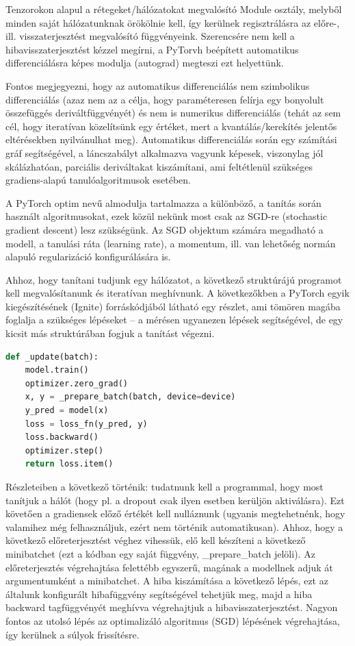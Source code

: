 \documentclass[12pt,a4paper,oneside]{report}             %
\begin{document}
Tenzorokon alapul a rétegeket/hálózatokat megvalósító Module osztály, melyből minden saját hálózatunknak örökölnie kell, így kerülnek regisztrálásra az előre-, ill. visszaterjesztést megvalósító függvényeink. Szerencsére nem kell a hibavisszaterjesztést kézzel megírni, a PyTorvh beépített automatikus differenciálásra képes modulja (autograd) megteszi ezt helyettünk.

Fontos megjegyezni, hogy az automatikus differenciálás nem szimbolikus differenciálás (azaz nem az a célja, hogy paraméteresen felírja egy bonyolult összefüggés deriváltfüggvényét) és nem is numerikus differenciálás (tehát az sem cél, hogy iteratívan közelítsünk egy értéket, mert a kvantálás/kerekítés jelentős eltérésekben nyilvánulhat meg). Automatikus differenciálás során egy számítási gráf segítségével, a láncszabályt alkalmazva vagyunk képesek, viszonylag jól skálázhatóan, parciális deriváltakat kiszámítani, ami feltétlenül szükséges gradiens-alapú tanulóalgoritmusok esetében.

A PyTorch optim nevű almodulja tartalmazza a különböző, a tanítás során használt algoritmusokat, ezek közül nekünk most csak az SGD-re (stochastic gradient descent) lesz szükségünk. Az SGD objektum számára megadható a modell, a tanulási ráta (learning rate), a momentum, ill. van lehetőség normán alapuló regularizáció konfigurálására is.

Ahhoz, hogy tanítani tudjunk egy hálózatot, a következő struktúrájú programot kell megvalósítanunk és iteratívan meghívnunk. A következőkben a PyTorch egyik kiegészítésének (Ignite) forráskódjából látható egy részlet, ami tömören magába foglalja a szükséges lépéseket – a mérésen ugyanezen lépések segítségével, de egy kicsit más struktúrában fogjuk a tanítást végezni.

\begin{lstlisting}[language=Python]
def _update(batch):
	model.train()
	optimizer.zero_grad()
	x, y = _prepare_batch(batch, device=device)
	y_pred = model(x)
	loss = loss_fn(y_pred, y)
	loss.backward()
	optimizer.step()
	return loss.item()
\end{lstlisting}

Részleteiben a következő történik: tudatnunk kell a programmal, hogy most tanítjuk a hálót (hogy pl. a dropout csak ilyen esetben kerüljön aktiválásra). Ezt követően a gradiensek előző értékét kell nulláznunk (ugyanis megtehetnénk, hogy valamihez még felhasználjuk, ezért nem történik automatikusan). Ahhoz, hogy a következő előreterjesztést véghez vihessük, elő kell készíteni a következő minibatchet (ezt a kódban egy saját függvény, \_prepare\_batch jelöli). Az előreterjesztés végrehajtása felettébb egyszerű, magának a modellnek adjuk át argumentumként a minibatchet. A hiba kiszámítása a következő lépés, ezt az általunk konfigurált hibafüggvény segítségével tehetjük meg, majd a hiba backward tagfüggvényét meghívva végrehajtjuk a hibavisszaterjesztést. Nagyon fontos az utolsó lépés az optimalizáló algoritmus (SGD) lépésének végrehajtása, így kerülnek a súlyok frissítésre.
\end{document}
